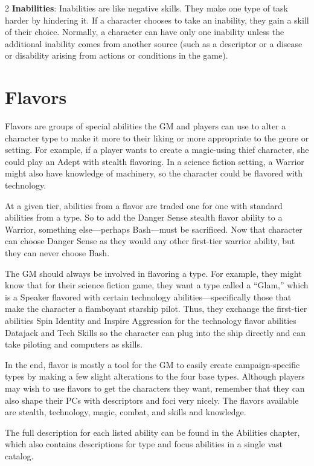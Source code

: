 \begin{multicols}{2}
\textbf{Inabilities}: Inabilities are like negative skills. They make one type of task harder by hindering it. If a character chooses to take an inability, they gain a skill of their choice. Normally, a character can have only one inability unless the additional inability comes from another source (such as a descriptor or a disease or disability arising from actions or conditions in the game).

\section{Flavors}

Flavors are groups of special abilities the GM and players can use to alter a character type to make it more to their liking or more appropriate to the genre or setting. For example, if a player wants to create a magic-using thief character, she could play an Adept with stealth flavoring. In a science fiction setting, a Warrior might also have knowledge of machinery, so the character could be flavored with technology.

At a given tier, abilities from a flavor are traded one for one with standard abilities from a type. So to add the Danger Sense stealth flavor ability to a Warrior, something else—perhaps Bash—must be sacrificed. Now that character can choose Danger Sense as they would any other first-tier warrior ability, but they can never choose Bash.

The GM should always be involved in flavoring a type. For example, they might know that for their science fiction game, they want a type called a “Glam,” which is a Speaker flavored with certain technology abilities—specifically those that make the character a flamboyant starship pilot. Thus, they exchange the first-tier abilities Spin Identity and Inspire Aggression for the technology flavor abilities Datajack and Tech Skills so the character can plug into the ship directly and can take piloting and computers as skills.

In the end, flavor is mostly a tool for the GM to easily create campaign-specific types by making a few slight alterations to the four base types. Although players may wish to use flavors to get the characters they want, remember that they can also shape their PCs with descriptors and foci very nicely.
The flavors available are stealth, technology, magic, combat, and skills and knowledge. 

The full description for each listed ability can be found in the Abilities chapter, which also contains descriptions for type and focus abilities in a single vast catalog.


\end{multicols}
